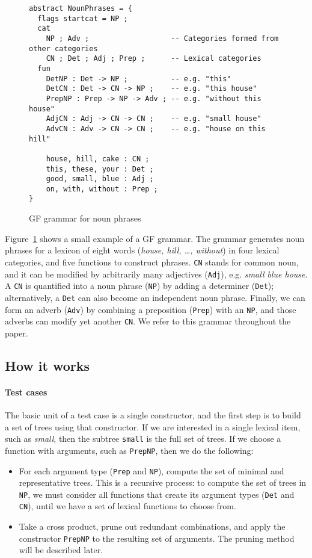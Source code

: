 \documentclass[11pt]{article}
\def\t#1{\texttt{#1}}
\begin{document}
\begin{figure}[h]
  \centering
    \begin{verbatim}
abstract NounPhrases = {
  flags startcat = NP ;
  cat
    NP ; Adv ;                   -- Categories formed from other categories
    CN ; Det ; Adj ; Prep ;      -- Lexical categories
  fun
    DetNP : Det -> NP ;          -- e.g. "this"
    DetCN : Det -> CN -> NP ;    -- e.g. "this house"
    PrepNP : Prep -> NP -> Adv ; -- e.g. "without this house"
    AdjCN : Adj -> CN -> CN ;    -- e.g. "small house"
    AdvCN : Adv -> CN -> CN ;    -- e.g. "house on this hill"

    house, hill, cake : CN ;
    this, these, your : Det ;
    good, small, blue : Adj ;
    on, with, without : Prep ;
}
\end{verbatim}
  \caption{GF grammar for noun phrases}
\label{fig:exampleGrammar}
\end{figure}

Figure~\ref{fig:exampleGrammar} shows a small example of a GF
grammar. The grammar generates noun phrases for a lexicon of eight
words (\emph{house, hill, \dots, without}) in four lexical categories,
and five functions to construct phrases.  
\t{CN} stands for common noun, and it can be modified by arbitrarily
many adjectives (\t{Adj}), e.g. \emph{small blue house}. A \t{CN} is
quantified into a noun phrase (\t{NP}) by adding a determiner
(\t{Det}); alternatively, a \t{Det} can also become an independent
noun phrase. Finally, we can form an adverb (\t{Adv}) by combining a
preposition (\t{Prep}) with an \t{NP}, and those adverbs can modify
yet another \t{CN}. 
We refer to this grammar throughout the paper.

\subsection{How it works}

\paragraph{Test cases} 
The basic unit of a test case is a single constructor, and the first step 
is to build a set of trees using that constructor.
If we are interested in a single lexical item, such as \emph{small}, 
then the subtree \t{small} is the full set of trees. If we choose a function 
with arguments, such as \t{PrepNP}, then we do the following: 
\begin{itemize}
\item For each argument type (\t{Prep} and \t{NP}), compute the
  set of minimal and representative trees. This is a recursive
  process: to compute the set of trees in \t{NP}, we must consider
  all functions that create its argument types (\t{Det} and \t{CN}),
  until we have a set of lexical functions to choose from. 
\item Take a cross product, prune out redundant combinations, and
  apply the constructor \t{PrepNP} to the resulting set of
  arguments. The pruning method will be described later. 
\end{itemize}
\end{document}
